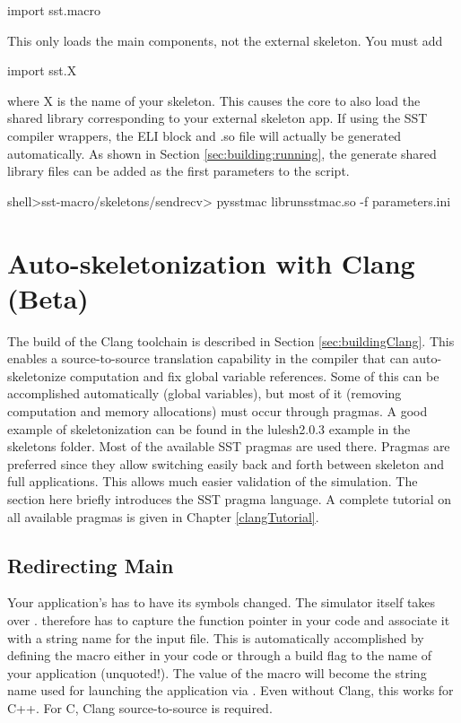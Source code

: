 \begin{ViFile}
import sst.macro
\end{ViFile}
This only loads the main components, not the external skeleton. You must add

\begin{ViFile}
import sst.X
\end{ViFile}
where X is the name of your skeleton. This causes the core to also load the shared library corresponding to your external skeleton app.
If using the SST compiler wrappers, the ELI block and .so file will actually be generated automatically.  As shown in Section \ref{sec:building:running},
the generate shared library files can be added as the first parameters to the  script.

\begin{ShellCmd}
shell>sst-macro/skeletons/sendrecv> pysstmac librunsstmac.so -f parameters.ini
\end{ShellCmd} 

\section{Auto-skeletonization with Clang (Beta)}
\label{sec:autoSkeletonization}

The build of the Clang toolchain is described in Section \ref{sec:buildingClang}. 
This enables a source-to-source translation capability in the  compiler that can auto-skeletonize computation and fix global variable references.
Some of this can be accomplished automatically (global variables), but most of it (removing computation and memory allocations) must occur through pragmas.
A good example of skeletonization can be found in the lulesh2.0.3 example in the skeletons folder. Most of the available SST pragmas are used there.
Pragmas are preferred since they allow switching easily back and forth between skeleton and full applications.
This allows much easier validation of the simulation. The section here briefly introduces the SST pragma language.
A complete tutorial on all available pragmas is given in Chapter \ref{clangTutorial}.

\subsection{Redirecting Main}
Your application's  has to have its symbols changed.
The simulator itself takes over .
\sstmacro therefore has to capture the function pointer in your code and associate it with a string name for the input file.
This is automatically accomplished by defining the macro  either in your code or through a  build flag to the name of your application (unquoted!). The value of the macro will become the string name used for launching the application via .
Even without Clang, this works for C++. For C, Clang source-to-source is required.

